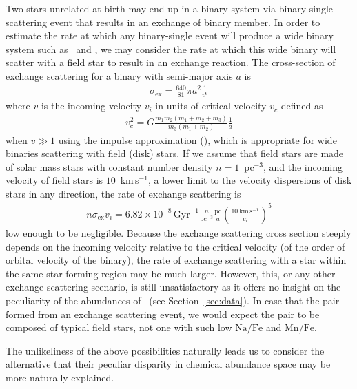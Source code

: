 \documentclass[manuscript]{aastex6}
\newcommand{\sectionname}{Section}
\newcommand*\elem[1]{\ensuremath{\mathrm{#1}}}
\newcommand{\sunanalog}{\text{Krios}}
\newcommand{\bizarreone}{\text{Kronos}}
\begin{document}
Two stars unrelated at birth may end up in a binary system via binary-single scattering event
that results in an exchange of binary member.
In order to estimate the rate at which any binary-single
event will produce a wide binary system such as \sunanalog\ and \bizarreone,
we may consider the rate at which this wide binary will scatter with a field star to
result in an exchange reaction.
The cross-section of exchange scattering for a binary with semi-major axis $a$ is
\begin{eqnarray}
  \sigma_\mathrm{ex} = \frac{640}{81} \pi a^{2} \frac{1}{v^6}
\end{eqnarray}
where $v$ is the incoming velocity $v_i$ in units of critical velocity $v_c$ defined as
\begin{eqnarray}
  v_c^2 = G \frac{m_1 m_2 (m_1 + m_2 + m_3)}{m_3 (m_1 + m_2)} \frac{1}{a}
\end{eqnarray}
when $v \gg 1$ using the impulse approximation (\citealt{Hut:1983aa,Hut:1983ab}),
which is appropriate for wide binaries scattering with field (disk) stars.
If we assume that field stars are made of solar mass stars
with constant number density $n=1$~pc$^{-3}$, and the incoming velocity of field stars
is $10$~km\,s$^{-1}$, a lower limit to the velocity dispersions of disk
stars in any direction, the rate of exchange scattering is
\begin{eqnarray}
  n \sigma_\mathrm{ex} v_i = 6.82\times 10^{-8}\,\mathrm{Gyr}^{-1}
  \frac{n}{\mathrm{pc}^{-3}} \frac{\mathrm{pc}}{a} \left(\frac{10~\mathrm{km}\,\mathrm{s}^{-1}}{v_i}\right)^5
\end{eqnarray}
low enough to be negligible.
Because the exchange scattering cross section steeply depends on the incoming velocity
relative to the critical velocity (of the order of orbital velocity of the binary),
the rate of exchange scattering with a star within the same star forming region
may be much larger.
However, this, or any other exchange scattering scenario,
is still unsatisfactory as it offers no insight on the
peculiarity of the abundances of \bizarreone\ (see
\sectionname~{\ref{sec:data}}).
In case that the pair formed from an exchange scattering event,
we would expect the pair to be composed of typical field stars,
not one with such low $\elem{Na}/\elem{Fe}$ and $\elem{Mn}/\elem{Fe}$.


The unlikeliness of the above possibilities naturally leads us to consider the
alternative that their peculiar disparity in chemical abundance space may be
more naturally explained.
\end{document}
